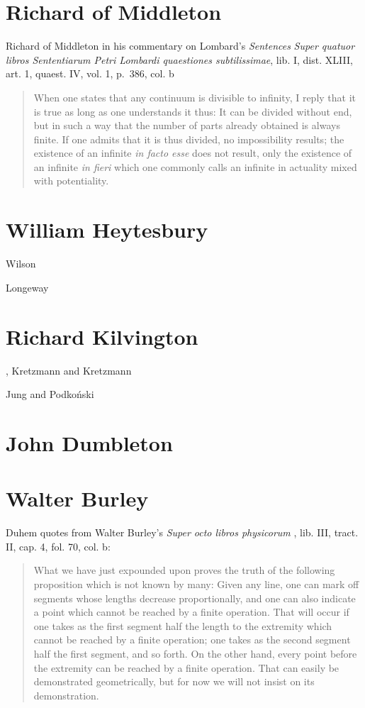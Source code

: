 \documentclass{article}
\begin{document}
\section{Richard of Middleton}
Richard of Middleton in his commentary on Lombard's {\em Sentences}  {\em Super quatuor libros Sententiarum Petri Lombardi quaestiones subtilissimae}, lib. I, dist. XLIII, art. 1, quaest. IV, vol. 1, p.~386, col. b \cite[p.~79]{ariew}
\begin{quote}
When one states that any continuum is divisible to infinity, I reply that it is true as long as one understands it thus: It can be divided without end, but in such a way that the number
of parts already obtained is always finite. If one admits that it is thus divided, no impossibility results; the existence of an infinite {\em in facto esse} does not result,
only the existence of an infinite {\em in fieri} which one commonly calls an infinite in actuality mixed with
potentiality.
\end{quote}

\section{William Heytesbury}
Wilson \cite{wilson}

Longeway \cite{longeway}

\section{Richard Kilvington},
Kretzmann and Kretzmann \cite{kilvington}

Jung and Podko\'nski \cite{jung}

\section{John Dumbleton}

\section{Walter Burley}
Duhem \cite[p.~57]{ariew} quotes from Walter Burley's {\em Super octo libros physicorum} \cite{burley}, lib. III, tract. II, cap. 4, fol. 70, col. b:
\begin{quote}
What we have just expounded upon proves the truth of the following proposition which is not known by many: Given any line, one can mark off segments whose lengths decrease proportionally, and one can also indicate a point which cannot be reached by a finite operation.
That will occur if one takes as the first segment half the length to the extremity which cannot be reached by a finite operation; one takes as the second segment half the first
segment, and so forth. On the other hand, every point before the extremity can be reached by a finite operation. That can easily be demonstrated geometrically, but for now
we will not insist on its demonstration.
\end{quote}
\end{document}
